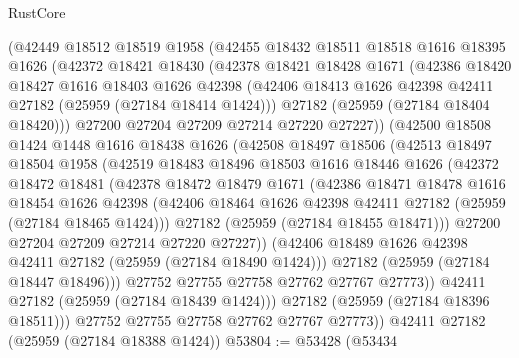 \begin{lexlean}{RustCore}
\begin{coremodule}
      (@42449
        @18512
        @18519
        @1958
        (@42455
          @18432
          @18511
          @18518
          @1616
          @18395
          @1626
          (@42372
            @18421
            @18430
            (@42378
              @18421
              @18428
              @1671
              (@42386
                @18420
                @18427
                @1616
                @18403
                @1626
                @42398
                (@42406 @18413 @1626 @42398 @42411 @27182 (@25959 (@27184 @18414 @1424)))
                @27182
                (@25959 (@27184 @18404 @18420)))
              @27200
              @27204
              @27209
              @27214
              @27220
              @27227))
          (@42500
            @18508
            @1424
            @1448
            @1616
            @18438
            @1626
            (@42508
              @18497
              @18506
              (@42513
                @18497
                @18504
                @1958
                (@42519
                  @18483
                  @18496
                  @18503
                  @1616
                  @18446
                  @1626
                  (@42372
                    @18472
                    @18481
                    (@42378
                      @18472
                      @18479
                      @1671
                      (@42386
                        @18471
                        @18478
                        @1616
                        @18454
                        @1626
                        @42398
                        (@42406 @18464 @1626 @42398 @42411 @27182 (@25959 (@27184 @18465 @1424)))
                        @27182
                        (@25959 (@27184 @18455 @18471)))
                      @27200
                      @27204
                      @27209
                      @27214
                      @27220
                      @27227))
                  (@42406 @18489 @1626 @42398 @42411 @27182 (@25959 (@27184 @18490 @1424)))
                  @27182
                  (@25959 (@27184 @18447 @18496)))
                @27752
                @27755
                @27758
                @27762
                @27767
                @27773))
            @42411
            @27182
            (@25959 (@27184 @18439 @1424)))
          @27182
          (@25959 (@27184 @18396 @18511)))
        @27752
        @27755
        @27758
        @27762
        @27767
        @27773))
    @42411
    @27182
    (@25959 (@27184 @18388 @1424))
@53804 := @53428
    (@53434

\end{coremodule}
\end{lexlean}
